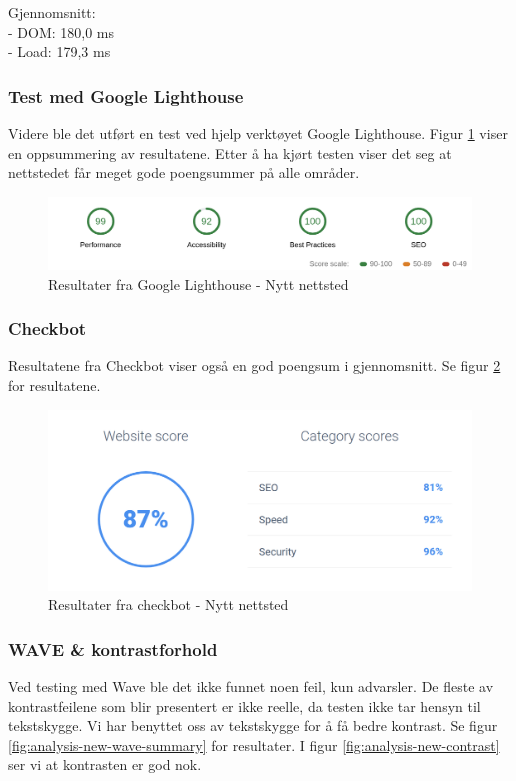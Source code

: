 Gjennomsnitt:\\
- DOM: 180,0 ms\\
- Load: 179,3 ms

\subsubsection{Test med Google Lighthouse}
Videre ble det utført en test ved hjelp verktøyet Google Lighthouse. Figur \ref{fig:analysis-new-lightouse-summary} viser en oppsummering av resultatene. Etter å ha kjørt testen viser det seg at nettstedet får meget gode poengsummer på alle områder. 

\begin{figure}[H]
    \centering
    \includegraphics[width=\textwidth]{bjornar/Lighthouse-Report-mobile-new.png}
    \caption{Resultater fra Google Lighthouse - Nytt nettsted}
    \label{fig:analysis-new-lightouse-summary}
\end{figure}

\subsubsection{Checkbot}
Resultatene fra Checkbot viser også en god poengsum i gjennomsnitt. Se figur \ref{fig:analysis-new-checkbot-summary} for resultatene.

\begin{figure}[H]
    \centering
    \includegraphics[width=\textwidth]{bjornar/checkbotio-summary-new.png}
    \caption{Resultater fra checkbot - Nytt nettsted}
    \label{fig:analysis-new-checkbot-summary}
\end{figure}

\subsubsection{WAVE \& kontrastforhold}
Ved testing med Wave ble det ikke funnet noen feil, kun advarsler. De fleste av kontrastfeilene som blir presentert er ikke reelle, da testen ikke tar hensyn til tekstskygge. Vi har benyttet oss av tekstskygge for å få bedre kontrast. Se figur \ref{fig:analysis-new-wave-summary} for resultater. I figur \ref{fig:analysis-new-contrast} ser vi at kontrasten er god nok.

